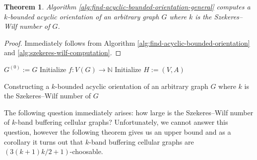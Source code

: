 \documentclass[a4paper, 12pt]{article}
\newtheorem{theo}[lem]{Theorem}
\begin{document}
\begin{theo} Algorithm \ref{alg:find-acyclic-bounded-orientation-general} computes a $k$-bounded acyclic orientation of an arbitrary graph $G$ where $k$ is the Szekeres\---Wilf number of $G$.
\end{theo}

\begin{proof} Immediately follows from Algorithm \ref{alg:find-acyclic-bounded-orientation} and \ref{alg:szekeres-wilf-computation}.
\end{proof}

\begin{algorithm}[h!]\label{alg:find-acyclic-bounded-orientation-general}
 $G^{(0)} := G$\;
 Initialize $f \colon V(G) \to \mathbb{N}$\;
 Initialize $H:=(V,A)$\;
 \caption{Constructing a $k$-bounded acyclic orientation of an arbitrary graph $G$ where $k$ is the Szekeres\---Wilf number of $G$}
\end{algorithm}

The following question immediately arises: how large is the Szekeres\---Wilf number of $k$-band buffering cellular graphs? Unfortunately, we cannot answer this question, however the following theorem gives us an upper bound and as a corollary it turns out that $k$-band buffering cellular graphs are $(3(k+1)k/2+1)$-choosable.
\end{document}
